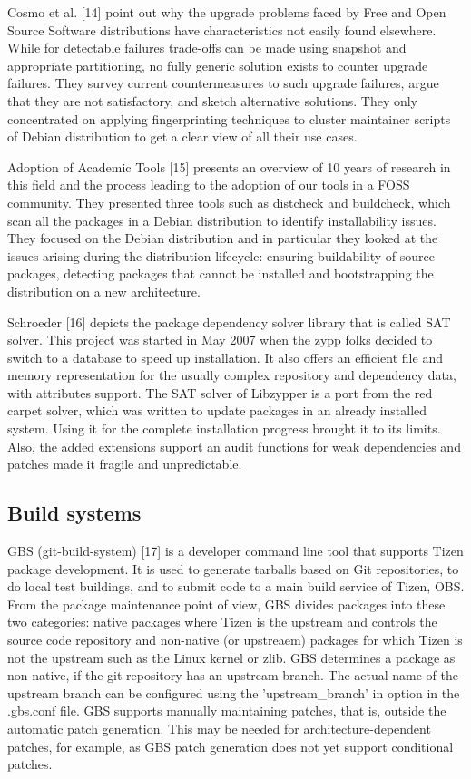 Cosmo et al. [14] point out why the upgrade problems faced by Free and Open Source Software distributions have characteristics not easily found elsewhere. While for detectable failures trade-offs can be made using snapshot and appropriate partitioning, no fully generic solution exists to counter upgrade failures. They survey current countermeasures to such upgrade failures, argue that they are not satisfactory, and sketch alternative solutions. They only concentrated on applying fingerprinting techniques to cluster maintainer scripts of Debian distribution to get a clear view of all their use cases.


Adoption of Academic Tools [15] presents an overview of 10 years of research in this field and the process leading to the adoption of our tools in a FOSS community. They presented three tools such as distcheck and buildcheck, which scan all the packages in a Debian distribution to identify installability issues. They focused on the Debian distribution and in particular they looked at the issues arising during the distribution lifecycle: ensuring buildability of source packages, detecting packages that cannot be installed and bootstrapping the distribution on a new architecture. 


Schroeder [16] depicts the package dependency solver library that is called SAT solver. This project was started in May 2007 when the zypp folks decided to switch to a database to speed up installation. It also offers an efficient file and memory representation for the usually complex repository and dependency data, with attributes support. The SAT solver of Libzypper is a port from the red carpet solver, which was written to update packages in an already installed system. Using it for the complete installation progress brought it to its limits. Also, the added extensions support an audit functions for weak dependencies and patches made it fragile and unpredictable. 


\subsection{Build systems}

GBS (git-build-system) [17] is a developer command line tool that supports Tizen package development. It is used to generate tarballs based on Git repositories, to do local test buildings, and to submit code to a main build service of Tizen, OBS. From the package maintenance point of view, GBS divides packages into these two categories: native packages where Tizen is the upstream and controls the source code repository and non-native (or upstreaem) packages for which Tizen is not the upstream such as the Linux kernel or zlib.  GBS determines a package as non-native, if the git repository has an upstream branch. The actual name of the upstream branch can be configured using the 'upstream\_branch' in option in the .gbs.conf file. GBS supports manually maintaining patches, that is, outside the automatic patch generation. This may be needed for architecture-dependent patches, for example, as GBS patch generation does not yet support conditional patches. 



